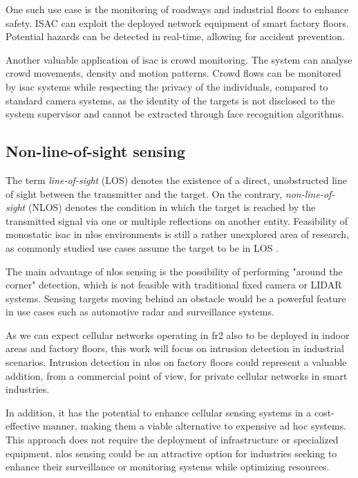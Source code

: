 	One such use case is the monitoring of roadways and industrial floors to enhance safety. ISAC can exploit the deployed network equipment of smart factory floors. Potential hazards can be detected in real-time, allowing for accident prevention. 
	
	Another valuable application of \gls{isac} is crowd monitoring. 
	The system can analyse crowd movements, density and motion patterns. 
	Crowd flows can be monitored by \gls{isac} systems while respecting the privacy of the individuals, compared to standard camera systems, as the identity of the targets is not disclosed to the system supervisor and cannot be extracted through face recognition algorithms.

	
	\subsection{Non-line-of-sight sensing}
	
	
	
	The term \textit{line-of-sight} (LOS)  denotes the existence of a direct, unobstructed line of sight between the transmitter and the target. On the contrary, \textit{non-line-of-sight} (NLOS) denotes the condition in which the target is reached by the transmitted signal via one or multiple reflections on another entity. 
	Feasibility of monostatic \gls{isac} in \gls{nlos} environments is still a rather unexplored area of research, as commonly studied use cases assume the target to be in LOS \cite{Gustaffson_NLOS_radar}.
	
	The main advantage of \gls{nlos} sensing is the possibility of performing "around the corner" detection, which is not feasible with traditional fixed camera or LIDAR systems. 
	Sensing targets moving behind an obstacle would be a powerful feature in use cases such as automotive radar and surveillance systems.
	
	As we can expect cellular networks operating in \gls{fr2} also to be deployed in indoor areas and factory floors, this work will focus on intrusion detection in industrial scenarios.
	Intrusion detection in \gls{nlos} on factory floors could represent a valuable addition, from a commercial point of view, for private cellular networks in smart industries.
	
	In addition, it has the potential to enhance cellular sensing systems in a cost-effective manner, making them a viable alternative to expensive ad hoc systems. This approach does not require the deployment of infrastructure or specialized equipment. 
	\gls{nlos} sensing could be an attractive option for industries seeking to enhance their surveillance or monitoring systems while optimizing resources.
	
	
	

